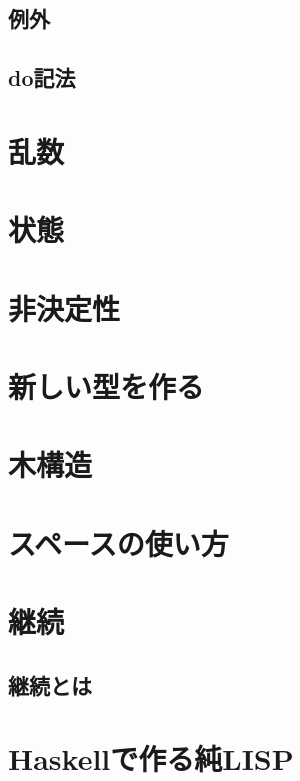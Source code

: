 \documentclass[a4paper,draft]{jsbook}
\newcommand{\programminglanguage}[1]{\textsf{#1}}
\newcommand{\cxx}{\programminglanguage{C}\texttt{++}}
\begin{document}
\section{例外}

\section{do記法}

\chapter{乱数}

\chapter{状態}

\chapter{非決定性}

\chapter{新しい型を作る}

\chapter{木構造}

\chapter{スペースの使い方}

\chapter{継続}

\section{継続とは}




\chapter{Haskellで作る純LISP}

\end{document}
